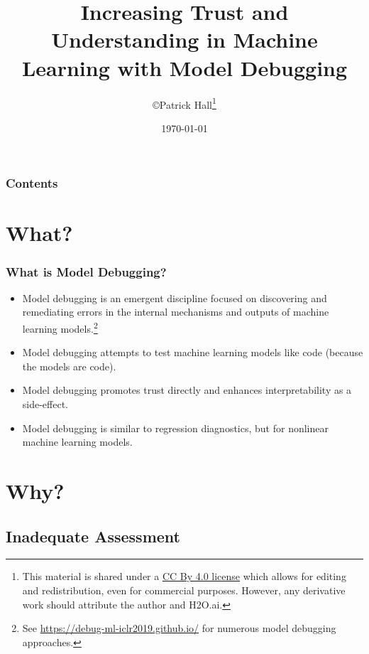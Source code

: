 \documentclass[11pt,
               aspectratio=43,
               hyperref={colorlinks}
               ]{beamer}
\author{\copyright\hspace{1pt}Patrick Hall\footnote{\tiny{This material is shared under a \href{https://creativecommons.org/licenses/by/4.0/deed.ast}{CC By 4.0 license} which allows for editing and redistribution, even for commercial purposes. However, any derivative work should attribute the author and H2O.ai.}}}
\title{Increasing Trust and Understanding in Machine Learning with Model Debugging }
\institute{\href{https://www.h2o.ai}{H\textsubscript{2}O.ai}}
\date{\today}
\begin{document}
	
	\maketitle
	
	\begin{frame}
	
		\frametitle{Contents}
		
		\tableofcontents{}
		
	\end{frame}

	\section{What?}

	\begin{frame}
		
		\frametitle{What is Model Debugging?}
		
		\begin{itemize}
			\item Model debugging is an emergent discipline focused on discovering and remediating errors in the internal mechanisms and outputs of machine learning models.\footnote{\tiny{See \url{https://debug-ml-iclr2019.github.io/} for numerous model debugging approaches.}} 
			\item Model debugging attempts to test machine learning models like code (because the models are code).
			\item Model debugging promotes trust directly and enhances interpretability as a side-effect.
			\item Model debugging is similar to regression diagnostics, but for nonlinear machine learning models.
		\end{itemize}
		
	\end{frame}

	\section{Why?}

		\subsection{Inadequate Assessment }
\end{document}
